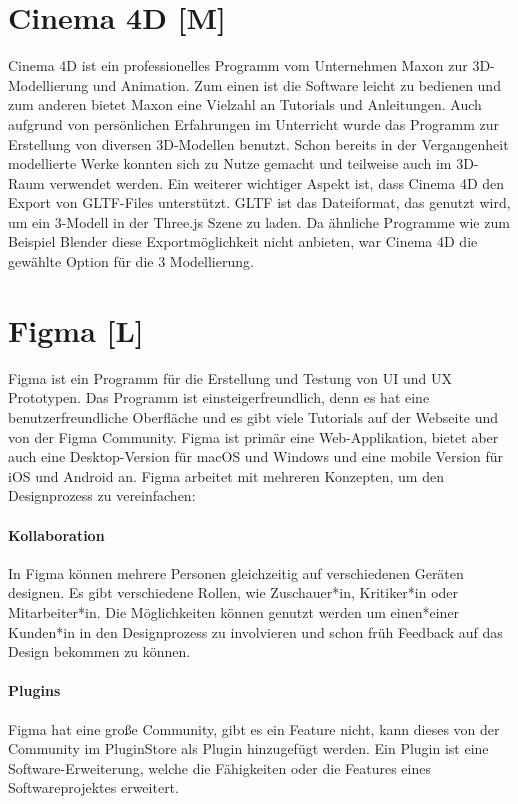 \section{Cinema 4D [M]}
Cinema 4D ist ein professionelles Programm vom Unternehmen Maxon zur 3D-Modellierung und Animation. Zum einen ist die Software leicht zu bedienen und zum anderen bietet Maxon eine Vielzahl an Tutorials und Anleitungen. Auch aufgrund von persönlichen Erfahrungen im Unterricht wurde das Programm zur Erstellung von diversen 3D-Modellen benutzt. Schon bereits in der Vergangenheit modellierte Werke konnten sich zu Nutze gemacht und teilweise auch im 3D-Raum verwendet werden. Ein weiterer wichtiger Aspekt ist, dass Cinema 4D den Export von GLTF-Files unterstützt. GLTF ist das Dateiformat, das genutzt wird, um ein 3-Modell in der Three.js Szene zu laden. Da ähnliche Programme wie zum Beispiel Blender diese Exportmöglichkeit nicht anbieten, war Cinema 4D die gewählte Option für die 3 Modellierung. 
\cite{Cinema4D}
 
\section{Figma [L]}
\label{ch::technologies::figma}
Figma ist ein Programm für die Erstellung und Testung von UI und UX Prototypen. Das Programm ist einsteigerfreundlich, denn es hat eine benutzerfreundliche Oberfläche und es gibt viele Tutorials auf der Webseite und von der Figma Community. Figma ist primär eine Web-Applikation, bietet aber auch eine Desktop-Version für macOS und Windows und eine mobile Version für iOS und Android an. Figma arbeitet mit mehreren Konzepten, um den Designprozess zu vereinfachen:
\paragraph{Kollaboration}
In Figma können mehrere Personen gleichzeitig auf verschiedenen Geräten designen. Es gibt verschiedene Rollen, wie Zuschauer*in, Kritiker*in oder Mitarbeiter*in. Die Möglichkeiten können genutzt werden um einen*einer Kunden*in in den Designprozess zu involvieren und schon früh Feedback auf das Design bekommen zu können.
\paragraph{Plugins}
Figma hat eine große Community, gibt es ein Feature nicht, kann dieses von der Community im PluginStore als Plugin hinzugefügt werden. Ein Plugin ist eine Software-Erweiterung, welche die Fähigkeiten oder die Features eines Softwareprojektes erweitert.

